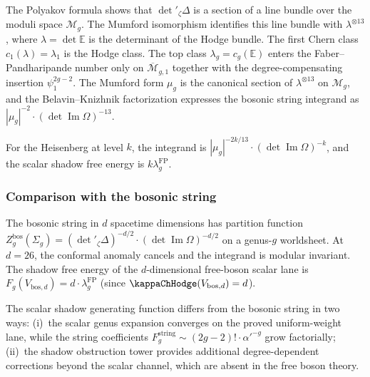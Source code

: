\begin{remark}
The Polyakov formula shows that $\det{}'_\zeta\Delta$ is a section of a line bundle over the moduli space $\mathcal{M}_g$. The Mumford isomorphism identifies this line bundle with $\lambda^{\otimes 13}$, where $\lambda = \det\mathbb{E}$ is the determinant of the Hodge bundle. The first Chern class $c_1(\lambda) = \lambda_1$ is the Hodge class. The top class $\lambda_g=c_g(\mathbb{E})$ enters the Faber--Pandharipande number only on $\overline{\mathcal{M}}_{g,1}$ together with the degree-compensating insertion $\psi_1^{2g-2}$. The Mumford form $\mu_g$ is the canonical section of $\lambda^{\otimes 13}$ on $\mathcal{M}_g$, and the Belavin--Knizhnik factorization expresses the bosonic string integrand as $|\mu_g|^{-2} \cdot (\det\operatorname{Im}\Omega)^{-13}$.

For the Heisenberg at level $k$, the integrand is $|\mu_g|^{-2k/13} \cdot (\det\operatorname{Im}\Omega)^{-k}$, and the scalar shadow free energy is $k\lambda_g^{\mathrm{FP}}$.
\end{remark}

\subsubsection{Comparison with the bosonic string}

\begin{remark}[Bosonic string at $d = 26$]
The bosonic string in $d$ spacetime dimensions has partition function $Z_g^{\mathrm{bos}}(\Sigma_g) = (\det{}'_\zeta\Delta)^{-d/2} \cdot (\det\operatorname{Im}\Omega)^{-d/2}$ on a genus-$g$ worldsheet. At $d = 26$, the conformal anomaly cancels and the integrand is modular invariant. The shadow free energy of the $d$-dimensional free-boson scalar lane is $F_g(V_{\mathrm{bos},d}) = d \cdot \lambda_g^{\mathrm{FP}}$ (since $\kappaChHodge(V_{\mathrm{bos},d})=d$).

The scalar shadow generating function differs from the bosonic string in two ways: (i)~the scalar genus expansion converges on the proved uniform-weight lane, while the string coefficients $F_g^{\mathrm{string}} \sim (2g-2)! \cdot \alpha'^{-g}$ grow factorially; (ii)~the shadow obstruction tower provides additional degree-dependent corrections beyond the scalar channel, which are absent in the free boson theory.
\end{remark}

